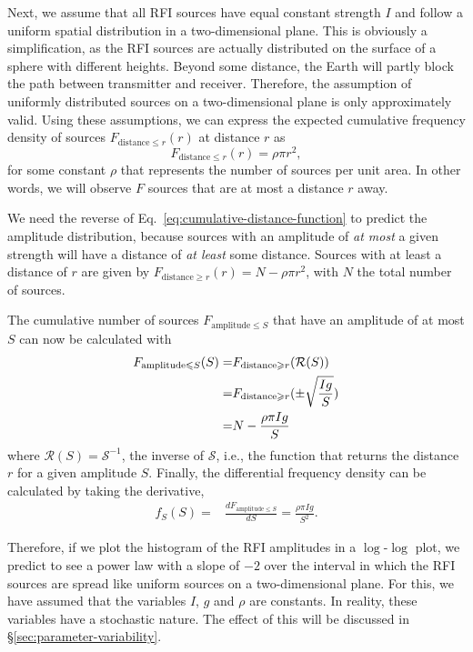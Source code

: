 \documentclass[useAMS,usenatbib]{mn2e}
\begin{document}
Next, we assume that all RFI sources have equal constant strength $I$ and follow a uniform spatial distribution in a two-dimensional plane. This is obviously a simplification, as the RFI sources are actually distributed on the surface of a sphere with different heights. Beyond some distance, the Earth will partly block the path between transmitter and receiver. Therefore, the assumption of uniformly distributed sources on a two-dimensional plane is only approximately valid. Using these assumptions, we can express the expected cumulative frequency density of sources $F_{\textrm{distance} \le r}(r)$ at distance $r$ as
\begin{equation} \label{eq:cumulative-distance-function}
F_{\textrm{distance} \le r}(r)=\rho \pi r^2,
\end{equation}
for some constant $\rho$ that represents the number of sources per unit area. In other words, we will observe $F$ sources that are at most a distance $r$ away.

We need the reverse of Eq.~\eqref{eq:cumulative-distance-function} to predict the amplitude distribution, because sources with an amplitude of \emph{at most} a given strength will have a distance of \emph{at least} some distance. Sources with at least a distance of $r$ are given by $F_{\textrm{distance} \ge r}(r) = N - \rho \pi r^2$, with $N$ the total number of sources.

The cumulative number of sources $F_{\textrm{amplitude} \le S}$ that have an amplitude of at most $S$ can now be calculated with
\begin{align} \label{eq:cumulative-rfi-distribution}
 F_{\textrm{amplitude} \le S}(S) = & F_{\textrm{distance} \ge r}(\mathcal{R}(S))\\
\notag = & F_{\textrm{distance} \ge r}(\pm\sqrt\frac{Ig}{S})\\
\notag = & N-\frac{\rho \pi Ig}{S}
\end{align}
where $\mathcal{R}(S)=\mathcal{S}^{-1}$, the inverse of $\mathcal{S}$, i.e., the function that returns the distance $r$ for a given amplitude $S$. Finally, the differential frequency density can be calculated by taking the derivative,
\begin{align} \label{eq:two-dimensional-distribution}
 f_S(S) = & \frac{dF_{\textrm{amplitude} \le S}}{dS} = \frac{\rho \pi Ig}{S^2}.
\end{align}

Therefore, if we plot the histogram of the RFI amplitudes in a $\log$-$\log$ plot, we predict to see a power law with a slope of $-2$ over the interval in which the RFI sources are spread like uniform sources on a two-dimensional plane. For this, we have assumed that the variables $I$, $g$ and $\rho$ are constants. In reality, these variables have a stochastic nature. The effect of this will be discussed in \S\ref{sec:parameter-variability}.
\end{document}
